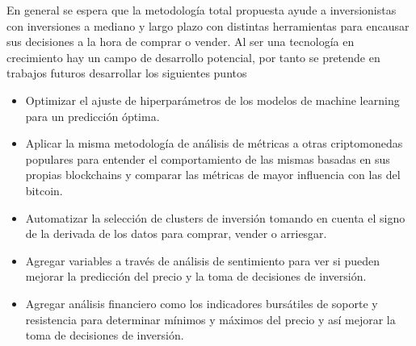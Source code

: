 En general se espera que la metodología total propuesta ayude a inversionistas con inversiones a mediano y largo plazo con distintas herramientas para encausar sus decisiones a la hora de comprar o vender. Al ser una tecnología en crecimiento hay un campo de desarrollo potencial, por tanto se pretende en trabajos futuros desarrollar los siguientes puntos

\begin{itemize}
	\item Optimizar el ajuste de hiperparámetros de los modelos de machine learning para un predicción óptima.
	\item Aplicar la misma metodología de análisis de métricas a otras criptomonedas populares para entender el comportamiento de las mismas basadas en sus propias blockchains y comparar las métricas de mayor influencia con las del bitcoin.
	\item Automatizar la selección de clusters de inversión tomando en cuenta el signo de la derivada de los datos para comprar, vender o arriesgar.
	\item Agregar variables a través de análisis de sentimiento para ver si pueden mejorar la predicción del precio y la toma de decisiones de inversión.
	\item Agregar análisis financiero como los indicadores bursátiles de soporte y resistencia para determinar mínimos y máximos del precio y así mejorar la toma de decisiones de inversión. 
\end{itemize}
















